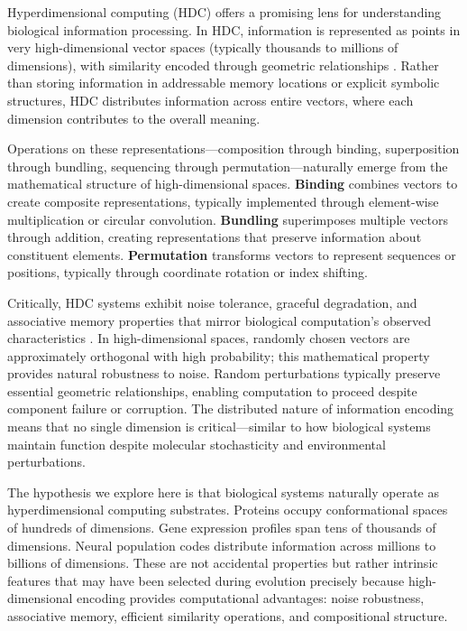 \documentclass[12pt]{article}
\begin{document}
Hyperdimensional computing (HDC) offers a promising lens for understanding biological information processing. In HDC, information is represented as points in very high-dimensional vector spaces (typically thousands to millions of dimensions), with similarity encoded through geometric relationships \citep{Kanerva2009}. Rather than storing information in addressable memory locations or explicit symbolic structures, HDC distributes information across entire vectors, where each dimension contributes to the overall meaning.

Operations on these representations—composition through binding, superposition through bundling, sequencing through permutation—naturally emerge from the mathematical structure of high-dimensional spaces. \textbf{Binding} combines vectors to create composite representations, typically implemented through element-wise multiplication or circular convolution. \textbf{Bundling} superimposes multiple vectors through addition, creating representations that preserve information about constituent elements. \textbf{Permutation} transforms vectors to represent sequences or positions, typically through coordinate rotation or index shifting.

Critically, HDC systems exhibit noise tolerance, graceful degradation, and associative memory properties that mirror biological computation's observed characteristics \citep{Rahimi2016}. In high-dimensional spaces, randomly chosen vectors are approximately orthogonal with high probability; this mathematical property provides natural robustness to noise. Random perturbations typically preserve essential geometric relationships, enabling computation to proceed despite component failure or corruption. The distributed nature of information encoding means that no single dimension is critical—similar to how biological systems maintain function despite molecular stochasticity and environmental perturbations.

The hypothesis we explore here is that biological systems naturally operate as hyperdimensional computing substrates. Proteins occupy conformational spaces of hundreds of dimensions. Gene expression profiles span tens of thousands of dimensions. Neural population codes distribute information across millions to billions of dimensions. These are not accidental properties but rather intrinsic features that may have been selected during evolution precisely because high-dimensional encoding provides computational advantages: noise robustness, associative memory, efficient similarity operations, and compositional structure.
\end{document}
